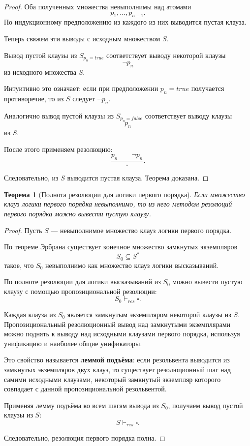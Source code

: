 \documentclass[12pt,a4paper]{article}
\newtheorem{theorem}{Теорема}
\begin{document}
\begin{proof}
Оба полученных множества невыполнимы над атомами
\[
p_1,\dots,p_{n-1}.
\]
По индукционному предположению из каждого из них выводится пустая клауза.

Теперь свяжем эти выводы с исходным множеством $S$.

Вывод пустой клаузы из $S_{p_n=true}$ соответствует выводу некоторой клаузы
\[
\neg p_n
\]
из исходного множества $S$.

Интуитивно это означает: если при предположении $p_n=true$ получается противоречие, то из $S$ следует $\neg p_n$.

Аналогично вывод пустой клаузы из $S_{p_n=false}$ соответствует выводу клаузы
\[
p_n
\]
из $S$.

После этого применяем резолюцию:
\[
\frac{p_n \qquad \neg p_n}{\square}.
\]

Следовательно, из $S$ выводится пустая клауза. Теорема доказана.
\end{proof}

\begin{theorem}[Полнота резолюции для логики первого порядка]
Если множество клауз логики первого порядка невыполнимо, то из него методом резолюций первого порядка можно вывести пустую клаузу.
\end{theorem}

\begin{proof}
Пусть $S$ --- невыполнимое множество клауз логики первого порядка.

По теореме Эрбрана существует конечное множество замкнутых экземпляров
\[
S_0 \subseteq S^*
\]
такое, что $S_0$ невыполнимо как множество клауз логики высказываний.

По полноте резолюции для логики высказываний из $S_0$ можно вывести пустую клаузу с помощью пропозициональной резолюции:
\[
S_0 \vdash_{res} \square.
\]

Каждая клауза из $S_0$ является замкнутым экземпляром некоторой клаузы из $S$. Пропозициональный резолюционный вывод над замкнутыми экземплярами можно поднять к выводу над исходными клаузами первого порядка, используя унификацию и наиболее общие унификаторы.

Это свойство называется \textbf{леммой подъёма}: если резольвента выводится из замкнутых экземпляров двух клауз, то существует резолюционный шаг над самими исходными клаузами, некоторый замкнутый экземпляр которого совпадает с данной пропозициональной резольвентой.

Применяя лемму подъёма ко всем шагам вывода из $S_0$, получаем вывод пустой клаузы из $S$:
\[
S \vdash_{res} \square.
\]

Следовательно, резолюция первого порядка полна.
\end{proof}
\end{document}
